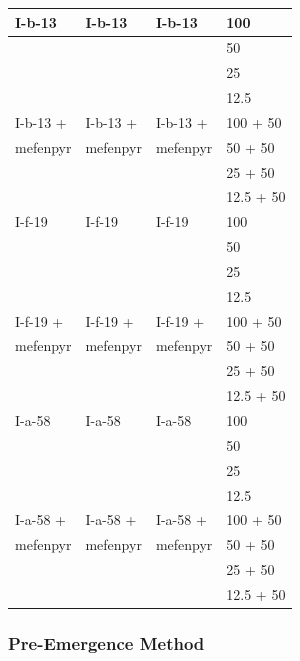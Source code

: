 \documentclass[11pt,a4paper]{article}
\begin{document}
\begin{table}[h]
\begin{tabular}{|l|l|l|l|}
I-b-13 & I-b-13 & I-b-13 & 100 \\ \hline
 &  &  & 50 \\ \hline
 &  &  & 25 \\ \hline
 &  &  & 12.5 \\ \hline
I-b-13 + & I-b-13 + & I-b-13 + & 100 + 50 \\ \hline
mefenpyr & mefenpyr & mefenpyr & 50 + 50 \\ \hline
 &  &  & 25 + 50 \\ \hline
 &  &  & 12.5 + 50 \\ \hline
I-f-19 & I-f-19 & I-f-19 & 100 \\ \hline
 &  &  & 50 \\ \hline
 &  &  & 25 \\ \hline
 &  &  & 12.5 \\ \hline
I-f-19 + & I-f-19 + & I-f-19 + & 100 + 50 \\ \hline
mefenpyr & mefenpyr & mefenpyr & 50 + 50 \\ \hline
 &  &  & 25 + 50 \\ \hline
 &  &  & 12.5 + 50 \\ \hline
I-a-58 & I-a-58 & I-a-58 & 100 \\ \hline
 &  &  & 50 \\ \hline
 &  &  & 25 \\ \hline
 &  &  & 12.5 \\ \hline
I-a-58 + & I-a-58 + & I-a-58 + & 100 + 50 \\ \hline
mefenpyr & mefenpyr & mefenpyr & 50 + 50 \\ \hline
 &  &  & 25 + 50 \\ \hline
 &  &  & 12.5 + 50 \\ \hline
\end{tabular}
\end{table}

\subsubsection{Pre-Emergence Method}
\end{document}
